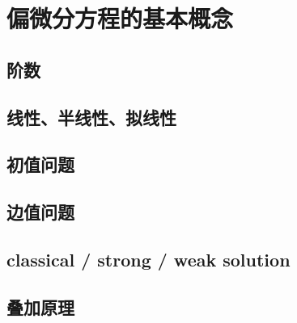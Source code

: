 \section{偏微分方程的基本概念}
\label{b2:sec:0104}


\subsection{阶数}
\label{b2:subsec:010401}

\subsection{线性、半线性、拟线性}
\label{b2:subsec:010402}

\subsection{初值问题}
\label{b2:subsec:010403}

\subsection{边值问题}
\label{b2:subsec:010404}

\subsection{classical / strong / weak solution}
\label{b2:subsec:010405}

\subsection{叠加原理}
\label{b2:subsec:010406}


